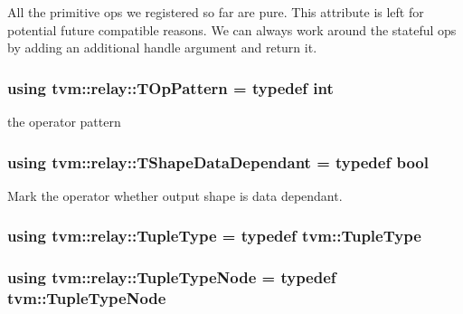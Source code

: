 All the primitive ops we registered so far are pure. This attribute is left for potential future compatible reasons. We can always work around the stateful ops by adding an additional handle argument and return it. 
\subsubsection[{\texorpdfstring{T\+Op\+Pattern}{TOpPattern}}]{\setlength{\rightskip}{0pt plus 5cm}using {\bf tvm\+::relay\+::\+T\+Op\+Pattern} = typedef int}\hypertarget{namespacetvm_1_1relay_a5dab2ddae20ac7564a81ab3a0a9aba76}{}\label{namespacetvm_1_1relay_a5dab2ddae20ac7564a81ab3a0a9aba76}


the operator pattern 

\subsubsection[{\texorpdfstring{T\+Shape\+Data\+Dependant}{TShapeDataDependant}}]{\setlength{\rightskip}{0pt plus 5cm}using {\bf tvm\+::relay\+::\+T\+Shape\+Data\+Dependant} = typedef bool}\hypertarget{namespacetvm_1_1relay_a75252d8d7e8d18b796074ffe4cc9f3ff}{}\label{namespacetvm_1_1relay_a75252d8d7e8d18b796074ffe4cc9f3ff}


Mark the operator whether output shape is data dependant. 

\subsubsection[{\texorpdfstring{Tuple\+Type}{TupleType}}]{\setlength{\rightskip}{0pt plus 5cm}using {\bf tvm\+::relay\+::\+Tuple\+Type} = typedef {\bf tvm\+::\+Tuple\+Type}}\hypertarget{namespacetvm_1_1relay_ace9102638dffea6747ae9fa9be9f00f2}{}\label{namespacetvm_1_1relay_ace9102638dffea6747ae9fa9be9f00f2}
\subsubsection[{\texorpdfstring{Tuple\+Type\+Node}{TupleTypeNode}}]{\setlength{\rightskip}{0pt plus 5cm}using {\bf tvm\+::relay\+::\+Tuple\+Type\+Node} = typedef {\bf tvm\+::\+Tuple\+Type\+Node}}\hypertarget{namespacetvm_1_1relay_a916609c894ac1000b66f9582f338d965}{}\label{namespacetvm_1_1relay_a916609c894ac1000b66f9582f338d965}
